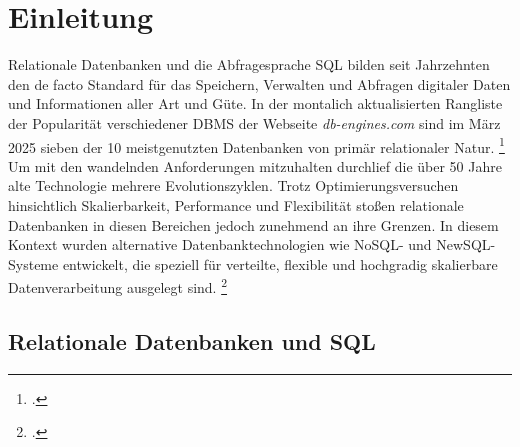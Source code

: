 \section{Einleitung}

Relationale Datenbanken und die Abfragesprache SQL bilden seit Jahrzehnten den de facto Standard für das Speichern, Verwalten und Abfragen digitaler Daten und Informationen aller Art und Güte. In der montalich aktualisierten Rangliste der Popularität verschiedener DBMS der Webseite \textit{db-engines.com} sind im März 2025 sieben der 10 meistgenutzten Datenbanken von primär relationaler Natur. \footcite{redgatesoftwareltd.DBEnginesRanking2025} Um mit den wandelnden Anforderungen mitzuhalten durchlief die über 50 Jahre alte Technologie mehrere Evolutionszyklen. Trotz Optimierungsversuchen hinsichtlich Skalierbarkeit, Performance und Flexibilität stoßen relationale Datenbanken 
in diesen Bereichen jedoch zunehmend an ihre Grenzen. In diesem Kontext wurden alternative Datenbanktechnologien wie NoSQL- und NewSQL-Systeme entwickelt, die speziell für verteilte, flexible und hochgradig skalierbare Datenverarbeitung ausgelegt sind. \footcite{}




\subsection{Relationale Datenbanken und SQL}

